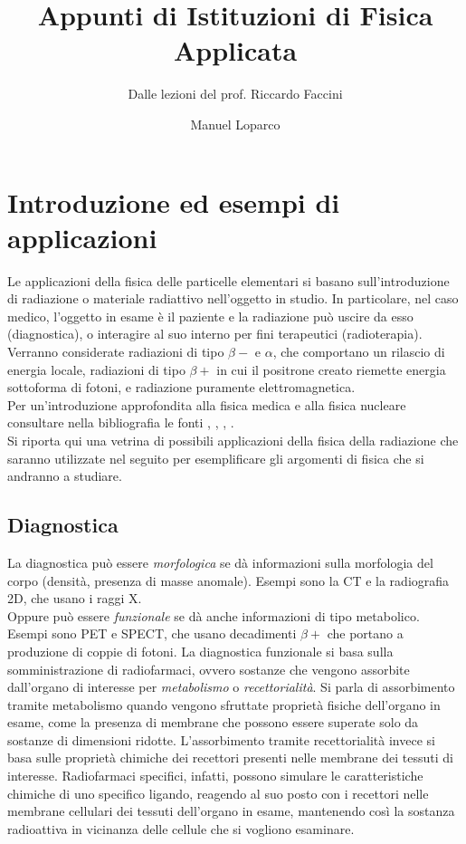 \documentclass [a4paper, twoside] {book}
\title{Appunti di Istituzioni di Fisica Applicata}
\subtitle{Dalle lezioni del prof. Riccardo Faccini}
\author{Manuel Loparco}
\begin{document}
\maketitle

\tableofcontents
\mainmatter

\chapter{Introduzione ed esempi di applicazioni}

Le applicazioni della fisica delle particelle elementari si basano sull'introduzione di radiazione o materiale radiattivo nell'oggetto in studio. In particolare, nel caso medico, l'oggetto in esame è il paziente e la radiazione può uscire da esso (diagnostica), o interagire al suo interno per fini terapeutici (radioterapia).
Verranno considerate radiazioni di tipo $\beta-$ e $\alpha$, che comportano un rilascio di energia locale, radiazioni di tipo $\beta+$ in cui il positrone creato riemette energia sottoforma di fotoni, e radiazione puramente elettromagnetica.\\
Per un'introduzione approfondita alla fisica medica e alla fisica nucleare consultare nella bibliografia le fonti \cite{ENMP} \cite{NMP}, \cite{CLA}, \cite{Corvisiero3}, \cite{Nutshell}.\\

Si riporta qui una vetrina di possibili applicazioni della fisica della radiazione che saranno utilizzate nel seguito per esemplificare gli argomenti di fisica che si andranno a studiare.

\section{Diagnostica}

La diagnostica può essere \emph{morfologica} se dà informazioni sulla morfologia del corpo (densità, presenza di masse anomale). Esempi sono la CT e la radiografia 2D, che usano i raggi X.\\
Oppure può essere \emph{funzionale} se dà anche informazioni di tipo metabolico. Esempi sono PET e SPECT, che usano decadimenti $\beta+$ che portano a produzione di coppie di fotoni.
La diagnostica funzionale si basa sulla somministrazione di radiofarmaci, ovvero sostanze che vengono assorbite dall'organo di interesse per \emph{metabolismo} o \emph{recettorialità}. Si parla di assorbimento tramite metabolismo quando vengono sfruttate proprietà fisiche dell'organo in esame, come la presenza di membrane che possono essere superate solo da sostanze di dimensioni ridotte. L'assorbimento tramite recettorialità invece si basa sulle proprietà chimiche dei recettori presenti nelle membrane dei tessuti di interesse. Radiofarmaci specifici, infatti, possono simulare le caratteristiche chimiche di uno specifico ligando, reagendo al suo posto con i recettori nelle membrane cellulari dei tessuti dell'organo in esame, mantenendo così la sostanza radioattiva in vicinanza delle cellule che si vogliono esaminare.
\end{document}
